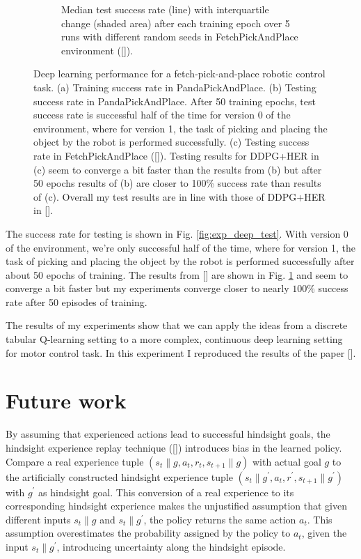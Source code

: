 \documentclass[conference]{IEEEtran}
\begin{document}
\begin{figure}[ht]
\begin{subfigure}[t]{0.30\textwidth}
\caption{Median test success rate (line) with interquartile change (shaded area) after each training epoch over 5 runs with different random seeds in FetchPickAndPlace environment ([\cite{plappert2018multi}]).}
\label{fig:exp_deep_test_plappert}
\end{subfigure}
\caption{Deep learning performance for a fetch-pick-and-place robotic control task. (a) Training success rate in PandaPickAndPlace. (b) Testing success rate in PandaPickAndPlace. After 50 training epochs, test success rate is successful half of the time for version 0 of the environment, where for version 1, the task of picking and placing the object by the robot is performed successfully. (c) Testing success rate in FetchPickAndPlace ([\cite{plappert2018multi}]). Testing results for DDPG+HER in (c) seem to converge a bit faster than the results from (b) but after 50 epochs results of (b) are closer to 100\% success rate than results of (c). Overall my test results are in line with those of DDPG+HER in [\cite{plappert2018multi}].}
\label{fig:exp_deep_perf}
\end{figure}

The success rate for testing is shown in Fig. \ref{fig:exp_deep_test}. With version 0 of the environment, we're only successful half of the time, where for version 1, the task of picking and placing the object by the robot is performed successfully after about 50 epochs of training. The results from [\cite{plappert2018multi}] are shown in Fig. \ref{fig:exp_deep_test_plappert} and seem to converge a bit faster but my experiments converge closer to nearly $100\%$ success rate after 50 episodes of training.

The results of my experiments show that we can apply the ideas from a discrete tabular Q-learning setting to a more complex, continuous deep learning setting for motor control task. In this experiment I reproduced the results of the paper [\cite{plappert2018multi}]. 

\section{Future work} \label{sec:future_work}
By assuming that experienced actions lead to successful hindsight goals, the hindsight experience replay technique ([\cite{andrychowicz2017hindsight}]) introduces bias in the learned policy. Compare a real experience tuple $(s_t\|g, a_t, r_t, s_{t+1}\|g)$ with actual goal $g$ to the artificially constructed hindsight experience tuple $(s_t\|g^{\prime}, a_t, r^{\prime}, s_{t+1}\|g^{\prime})$ with $g^{\prime}$ as hindsight goal. This conversion of a real experience to its corresponding hindsight experience makes the unjustified assumption that given different
inputs $s_t\|g$ and $s_t\|g^{\prime}$, the policy returns the same action $a_t$. This assumption overestimates the probability assigned by the policy to $a_t$, given the input $s_t\|g^{\prime}$, introducing uncertainty along the hindsight episode.
\end{document}

